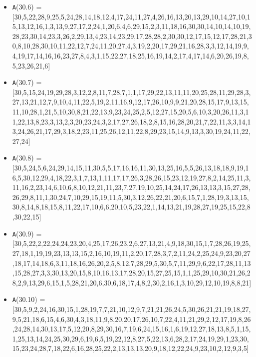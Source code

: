 \documentclass[runningheads,a4paper]{llncs}
\begin{document}
\begin{itemize}
	\item {\texttt A(30.6) = } [30,5,22,28,9,25,5,24,28,14,18,12,4,17,24,11,27,4,26,16,13,20,13,29,10,14,27,10,15,13,12,16,1,3,13,9,27,17,2,24,1,20,6,4,6,29,15,2,3,11,18,16,30,30,14,10,14,10,19,28,23,30,14,23,3,26,2,29,13,4,23,14,23,29,17,28,28,2,30,30,12,17,15,12,17,28,21,30,8,10,28,30,10,11,22,12,7,24,11,20,27,4,3,19,2,20,17,29,21,16,28,3,3,12,14,19,9,4,19,17,14,16,16,23,27,8,4,3,1,15,22,27,18,25,16,19,14,2,17,4,17,14,6,20,26,19,8,5,23,26,21,6]
	\item {\texttt A(30.7) = } [30,5,15,24,19,29,28,3,12,2,8,11,7,28,7,1,1,17,29,22,13,11,11,20,25,28,11,29,28,3,27,13,21,12,7,9,10,4,11,22,5,19,2,11,16,9,12,17,26,10,9,9,21,20,28,15,17,9,13,15,11,10,28,1,21,5,10,30,8,21,22,13,9,23,24,25,2,5,12,27,15,20,5,6,10,3,20,26,11,3,11,22,13,8,23,3,13,2,3,20,23,24,3,2,17,27,26,18,2,8,15,16,28,20,21,7,22,11,3,3,14,13,24,26,21,17,29,3,18,2,23,11,25,26,12,11,22,8,29,23,15,14,9,13,3,30,19,24,11,22,27,24]
	\item {\texttt A(30.8) = } [30,5,24,5,6,24,29,14,15,11,30,5,5,17,16,16,11,30,13,25,16,5,5,26,13,18,18,9,19,16,5,30,12,29,4,18,22,3,1,7,13,1,11,17,17,26,3,28,26,15,23,12,19,27,8,2,14,25,11,3,11,16,2,23,14,6,10,6,8,10,12,21,11,23,7,27,19,10,25,14,24,17,26,13,13,3,15,27,28,26,29,8,11,1,30,24,7,10,29,15,19,11,5,30,3,12,26,22,21,20,6,15,7,1,28,19,3,13,15,30,8,14,8,18,15,8,11,22,17,10,6,6,20,10,5,23,22,1,14,13,21,19,28,27,19,25,15,22,8,30,22,15]
	
	\item {\texttt A(30.9) = } [30,5,22,2,22,24,24,23,20,4,25,17,26,23,2,6,27,13,21,4,9,18,30,15,1,7,28,26,19,25,27,18,1,19,19,23,13,13,15,2,16,10,19,11,2,20,17,28,3,7,2,11,24,2,25,24,9,23,20,27,18,17,14,18,6,3,11,18,16,26,20,2,5,8,12,7,28,29,5,30,5,7,11,29,9,6,22,17,28,11,13,15,28,27,3,3,30,13,20,15,8,10,16,13,17,28,20,15,27,25,15,1,1,25,29,10,30,21,26,28,2,9,13,29,6,15,1,5,28,21,20,6,30,6,18,17,4,8,2,30,2,16,1,3,10,29,12,10,19,8,8,21]
	
	\item {\texttt A(30.10) = } [30,5,9,2,24,16,30,15,1,28,19,7,7,21,10,12,9,7,21,21,26,24,5,30,26,21,21,19,18,27,9,5,21,18,6,15,4,6,30,4,3,18,11,9,8,20,20,17,26,10,7,22,4,11,21,29,2,12,17,19,8,26,24,28,14,30,13,17,5,12,20,8,29,30,16,7,19,6,24,15,16,1,6,19,12,27,18,13,8,5,1,15,1,25,13,14,24,25,30,29,6,19,6,5,19,22,12,8,27,5,22,13,6,28,2,17,24,19,29,1,23,30,15,23,24,28,7,18,22,6,16,28,25,22,2,13,13,13,20,9,18,12,22,24,9,23,10,2,12,9,3,5]
\end{itemize}
\end{document}
